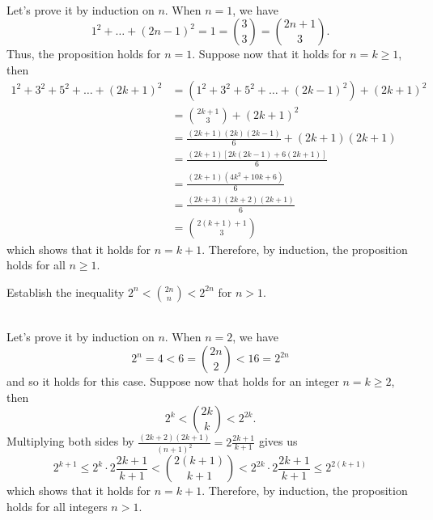 \begin{solution}
    \\ Let's prove it by induction on $n$. When $n = 1$, we have 
    $$1^2 + \dots + (2n-1)^2 = 1 = \binom{3}{3} = \binom{2n+1}{3}.$$
    Thus, the proposition holds for $n = 1$. Suppose now that it holds for $n = k \geq 1$, then 
    \begin{align*}
        1^2 + 3^2 + 5^2 + \dots + (2k+1)^2 &= (1^2 + 3^2 + 5^2 + \dots + (2k-1)^2) + (2k+1)^2 \\
        &= \binom{2k+1}{3} + (2k+1)^2 \\
        &= \frac{(2k+1)(2k)(2k-1)}{6} + (2k+1)(2k+1) \\
        &= \frac{(2k+1)[2k(2k-1) + 6(2k+1)]}{6} \\
        &= \frac{(2k+1)(4k^2 + 10k + 6)}{6} \\
        &= \frac{(2k+3)(2k+2)(2k+1)}{6} \\
        &= \binom{2(k+1) + 1}{3}
    \end{align*}
    which shows that it holds for $n = k+1$. Therefore, by induction, the proposition holds for all $n \geq 1$.\\
\end{solution}

\begin{exercise}
    Establish the inequality $2^n < \displaystyle \binom{2n}{n } < 2^{2n}$ for $n > 1$. 
\end{exercise}

\begin{solution}
    \\ Let's prove it by induction on $n$. When $n = 2$, we have 
    $$2^n = 4 < 6 = \binom{2n}{2} < 16 = 2^{2n}$$
    and so it holds for this case. Suppose now that holds for an integer $n = k \geq 2$, then
    $$2^k < \binom{2k}{k } < 2^{2k}.$$
    Multiplying both sides by $\frac{(2k+2)(2k+1)}{(n+1)^2} = 2\frac{2k+1}{k+1}$ gives us
    $$2^{k+1} \leq 2^k \cdot 2\frac{2k+1}{k+1} < \binom{2(k+1)}{k+1} < 2^{2k} \cdot 2\frac{2k+1}{k+1} \leq 2^{2(k+1)} $$
    which shows that it holds for $n = k+1$. Therefore, by induction, the proposition holds for all integers $n > 1$.
\end{solution}